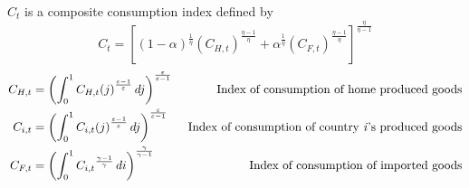 \documentclass[12pt]{article}
\begin{document}
$C_t$ is a composite consumption index defined by
\begin{equation}
    C_t = \left[ (1-\alpha)^\frac{1}{\eta} (C_{H,t})^{\frac{\eta-1}{\eta}} + \alpha^{\frac{1}{\eta}}(C_{F,t})^{\frac{\eta-1}{\eta}}\right]^{\frac{\eta}{\eta-1}}
\end{equation}
\begin{align}
    C_{H,t} & = \left( \int_{0}^{1} {C_{H,t}(j)}^{\frac{\varepsilon-1}{\varepsilon}} \,dj  \right)^\frac{\varepsilon}{\varepsilon-1} & \text{ Index of consumption of home produced goods}                 \\
    C_{i,t} & = \left( \int_{0}^{1} {C_{i,t}(j)}^{\frac{\varepsilon-1}{\varepsilon}} \,dj  \right)^\frac{\varepsilon}{\varepsilon-1} & \text{ Index of consumption of country \textit{i}'s produced goods} \\
    C_{F,t} & = \left( \int_{0}^{1} {C_{i,t}}^{\frac{\gamma-1}{\gamma}} \,di  \right)^{\frac{\gamma}{\gamma-1}}                      & \text{ Index of consumption of imported goods}
\end{align}
\end{document}
